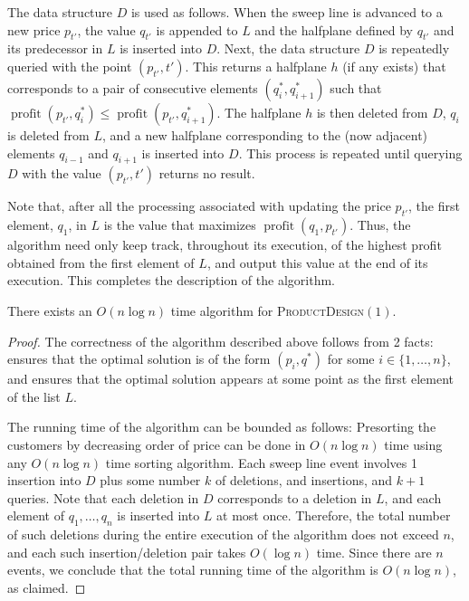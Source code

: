 \documentclass{llncs}
\newcommand{\val}{\operatorname{profit}}
\begin{document}
The data structure $D$ is used as follows.  When the sweep line is
advanced to a new price $p_{t'}$, the value $q_{t'}$ is appended to
$L$ and the halfplane defined by $q_{t'}$ and its predecessor in $L$
is inserted into $D$.  Next, the data structure $D$ is repeatedly
queried with the point $(p_{t'},t')$.  This returns a halfplane
$h$ (if any exists) that corresponds to a pair of consecutive
elements $(q_i^*,q_{i+1}^*)$ such that $\val(p_{t'},q_i^*) \le
\val(p_{t'},q_{i+1}^*)$.  The halfplane $h$ is then deleted from $D$,
$q_{i}$ is deleted from $L$, and a new halfplane corresponding to the
(now adjacent) elements $q_{i-1}$ and $q_{i+1}$ is inserted into $D$.
This process is repeated until querying $D$ with the value $(p_{t'},t')$
returns no result.

Note that, after all the processing associated with updating the price
$p_{t'}$, the first element, $q_1$, in $L$ is the value that maximizes
$\val(q_1,p_{t'})$. Thus, the algorithm need only keep track, throughout
its execution, of the highest profit obtained from the first element of
$L$, and output this value at the end of its execution.  This completes
the description of the algorithm.

\begin{thm}
  There exists an $O(n\log n)$ time algorithm for
  \textsc{ProductDesign$(1)$}.
\end{thm}

\begin{proof}
  The correctness of the algorithm described above follows from 2 facts:
   ensures that the optimal solution is of the form
  $(p_i,q^*)$ for some $i\in\{1,\ldots,n\}$, and 
  ensures that the optimal solution appears at some point as the first
  element of the list $L$.

  The running time of the algorithm can be bounded as follows: Presorting
  the customers by decreasing order of price can be done in $O(n\log n)$
  time using any $O(n\log n)$ time sorting algorithm. Each sweep line
  event involves 1 insertion into $D$ plus some number $k$ of deletions,
  and insertions, and $k+1$ queries.  Note that each deletion in $D$
  corresponds to a deletion in $L$, and each element of $q_1,\ldots,q_n$
  is inserted into $L$ at most once.  Therefore, the total number of such
  deletions during the entire execution of the algorithm does not exceed
  $n$, and each such insertion/deletion pair takes $O(\log n)$ time.
  Since there are $n$ events, we conclude that the total running time
  of the algorithm is $O(n\log n)$, as claimed.
\end{proof}
\end{document}

